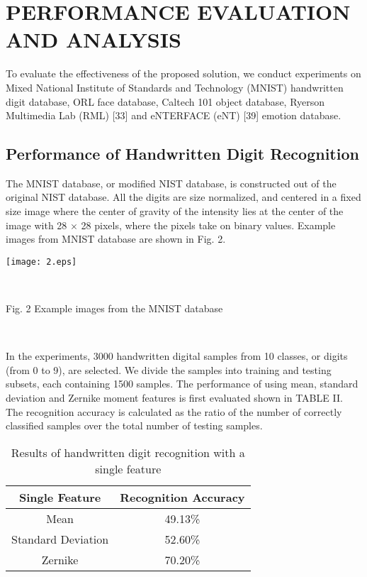 \documentclass[journal]{IEEEtran}
\begin{document}
\section{PERFORMANCE EVALUATION AND ANALYSIS}
To evaluate the effectiveness of the proposed solution, we conduct experiments on Mixed National Institute of Standards and Technology (MNIST) handwritten digit database, ORL face database, Caltech 101 object database, Ryerson Multimedia Lab (RML) [33] and eNTERFACE (eNT) [39] emotion database.
\subsection{Performance of Handwritten Digit Recognition}
The MNIST database, or modified NIST database, is constructed out of the original NIST database. All the digits are size normalized, and centered in a fixed size image where the center of gravity of the intensity lies at the center of the image with 28 $\times$ 28 pixels, where the pixels take on binary values. Example images from MNIST database are shown in Fig. 2.\\
\centerline {\texttt{[image: 2.eps]}}\\  \centerline {Fig. 2  Example images from the MNIST database}\\\indent

In the experiments, 3000 handwritten digital samples from 10 classes, or digits (from 0 to 9), are selected. We divide the samples into training and testing subsets, each containing 1500 samples. The performance of using mean, standard deviation and Zernike moment features is first evaluated shown in TABLE II. The recognition accuracy is calculated as the ratio of the number of correctly classified samples over the total number of testing samples.
\vspace*{-10pt}
\begin{table}[h]
\small
\renewcommand{\arraystretch}{1.3}
\caption{\normalsize{Results of handwritten digit recognition with a single feature}}
\setlength{\abovecaptionskip}{0pt}
\setlength{\belowcaptionskip}{10pt}
\centering
\tabcolsep 0.073in
\begin{tabular}{cc}
\hline
Single Feature & Recognition Accuracy\\
\hline
Mean &49.13\%\\
Standard Deviation &52.60\%\\
Zernike &70.20\%\\
\hline
\end{tabular}
\end{table}\\
\end{document}
